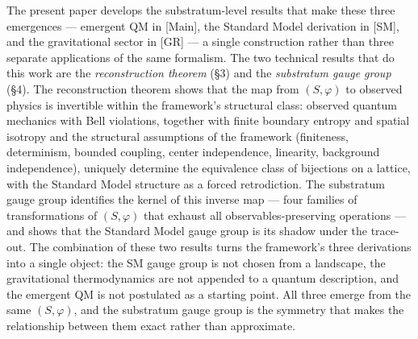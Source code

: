 \documentclass[
]{article}
\begin{document}
The present paper develops the substratum-level results that make these
three emergences --- emergent QM in {[}Main{]}, the Standard Model
derivation in {[}SM{]}, and the gravitational sector in {[}GR{]} --- a
single construction rather than three separate applications of the same
formalism. The two technical results that do this work are the
\emph{reconstruction theorem} (§3) and the \emph{substratum gauge group}
(§4). The reconstruction theorem shows that the map from
\((S, \varphi)\) to observed physics is invertible within the
framework's structural class: observed quantum mechanics with Bell
violations, together with finite boundary entropy and spatial isotropy
and the structural assumptions of the framework (finiteness,
determinism, bounded coupling, center independence, linearity,
background independence), uniquely determine the equivalence class of
bijections on a lattice, with the Standard Model structure as a forced
retrodiction. The substratum gauge group identifies the kernel of this
inverse map --- four families of transformations of \((S, \varphi)\)
that exhaust all observables-preserving operations --- and shows that
the Standard Model gauge group is its shadow under the trace-out. The
combination of these two results turns the framework's three derivations
into a single object: the SM gauge group is not chosen from a landscape,
the gravitational thermodynamics are not appended to a quantum
description, and the emergent QM is not postulated as a starting point.
All three emerge from the same \((S, \varphi)\), and the substratum
gauge group is the symmetry that makes the relationship between them
exact rather than approximate.
\end{document}
